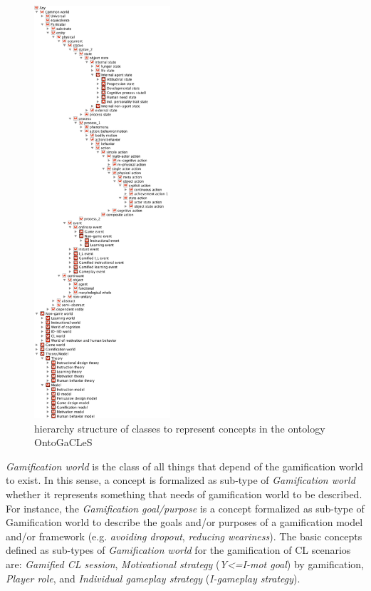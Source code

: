 \begin{figure}[!htb]
 \caption{ hierarchy structure of classes to represent concepts in the ontology OntoGaCLeS}
 \label{fig:is-a-hierarchy-structure-of-classes}
 \centering
 \includegraphics[width=0.45\textwidth]{images/chap-ontogacles2/is-a-hierarchy-structure-of-classes.png}
 \fautor
\end{figure}
\newpage

\emph{Gamification world} is the class of all things that depend of the gamification world to exist. In this sense, a concept is formalized as sub-type of \emph{Gamification world} whether it represents something that needs of gamification world to be described. For instance, the \emph{Gamification goal/purpose} is a concept formalized as sub-type of Gamification world to describe the goals and/or purposes of a gamification model and/or framework (e.g. \emph{avoiding dropout}, \emph{reducing weariness}). The basic concepts defined as sub-types of \emph{Gamification world} for the gamification of CL scenarios are: \emph{Gamified CL session}, \emph{Motivational strategy}  (\emph{Y<=I-mot goal}) by gamification, \emph{Player role}, and \emph{Individual gameplay strategy} (\emph{I-gameplay strategy}).

